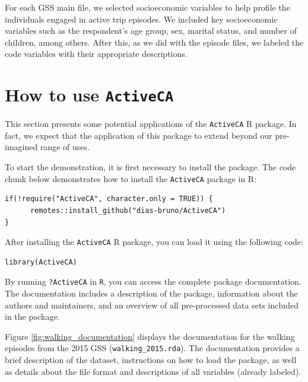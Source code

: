 \documentclass[Royal,times,sageh]{sagej}
\begin{document}
For each GSS main file, we selected socioeconomic variables to help
profile the individuals engaged in active trip episodes. We included key
socioeconomic variables such as the respondent's age group, sex, marital
status, and number of children, among others. After this, as we did with
the episode files, we labeled the code variables with their appropriate
descriptions.

\section{\texorpdfstring{How to use
\texttt{ActiveCA}}{How to use ActiveCA}}\label{how-to-use-activeca}

This section presents some potential applications of the
\texttt{ActiveCA} R package. In fact, we expect that the application of
this package to extend beyond our pre-imagined range of uses.

To start the demonstration, it is first necessary to install the
package. The code chunk below demonstrates how to install the
\texttt{ActiveCA} package in R:

\begin{verbatim}
if(!require("ActiveCA", character.only = TRUE)) {
      remotes::install_github("dias-bruno/ActiveCA")
}
\end{verbatim}

After installing the \texttt{ActiveCA} R package, you can load it using
the following code:

\begin{verbatim}
library(ActiveCA)
\end{verbatim}

By running \texttt{?ActiveCA} in \texttt{R}, you can access the complete
package documentation. The documentation includes a description of the
package, information about the authors and maintainers, and an overview
of all pre-processed data sets included in the package.

Figure \ref{fig:walking_documentation} displays the documentation for
the walking episodes from the 2015 GSS (\texttt{walking\_2015.rda}). The
documentation provides a brief description of the dataset, instructions
on how to load the package, as well as details about the file format and
descriptions of all variables (already labeled).
\end{document}
